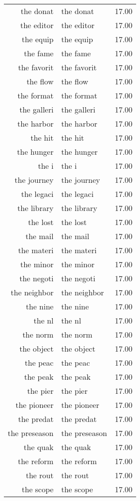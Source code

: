 \begin{table}[ht]
\begin{tabular}{rlr}
  the donat & the donat & 17.00 \\ 
  the editor & the editor & 17.00 \\ 
  the equip & the equip & 17.00 \\ 
  the fame & the fame & 17.00 \\ 
  the favorit & the favorit & 17.00 \\ 
  the flow & the flow & 17.00 \\ 
  the format & the format & 17.00 \\ 
  the galleri & the galleri & 17.00 \\ 
  the harbor & the harbor & 17.00 \\ 
  the hit & the hit & 17.00 \\ 
  the hunger & the hunger & 17.00 \\ 
  the i & the i & 17.00 \\ 
  the journey & the journey & 17.00 \\ 
  the legaci & the legaci & 17.00 \\ 
  the library & the library & 17.00 \\ 
  the lost & the lost & 17.00 \\ 
  the mail & the mail & 17.00 \\ 
  the materi & the materi & 17.00 \\ 
  the minor & the minor & 17.00 \\ 
  the negoti & the negoti & 17.00 \\ 
  the neighbor & the neighbor & 17.00 \\ 
  the nine & the nine & 17.00 \\ 
  the nl & the nl & 17.00 \\ 
  the norm & the norm & 17.00 \\ 
  the object & the object & 17.00 \\ 
  the peac & the peac & 17.00 \\ 
  the peak & the peak & 17.00 \\ 
  the pier & the pier & 17.00 \\ 
  the pioneer & the pioneer & 17.00 \\ 
  the predat & the predat & 17.00 \\ 
  the preseason & the preseason & 17.00 \\ 
  the quak & the quak & 17.00 \\ 
  the reform & the reform & 17.00 \\ 
  the rout & the rout & 17.00 \\ 
  the scope & the scope & 17.00 \\ 

\end{tabular}
\end{table}
